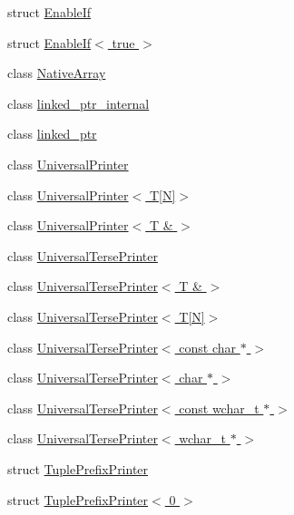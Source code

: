 \begin{DoxyCompactItemize}
\item 
struct \hyperlink{structtesting_1_1internal_1_1EnableIf}{Enable\-If}
\item 
struct \hyperlink{structtesting_1_1internal_1_1EnableIf_3_01true_01_4}{Enable\-If$<$ true $>$}
\item 
class \hyperlink{classtesting_1_1internal_1_1NativeArray}{Native\-Array}
\item 
class \hyperlink{classtesting_1_1internal_1_1linked__ptr__internal}{linked\-\_\-ptr\-\_\-internal}
\item 
class \hyperlink{classtesting_1_1internal_1_1linked__ptr}{linked\-\_\-ptr}
\item 
class \hyperlink{classtesting_1_1internal_1_1UniversalPrinter}{Universal\-Printer}
\item 
class \hyperlink{classtesting_1_1internal_1_1UniversalPrinter_3_01T[N]_4}{Universal\-Printer$<$ T\mbox{[}\-N\mbox{]}$>$}
\item 
class \hyperlink{classtesting_1_1internal_1_1UniversalPrinter_3_01T_01_6_01_4}{Universal\-Printer$<$ T \& $>$}
\item 
class \hyperlink{classtesting_1_1internal_1_1UniversalTersePrinter}{Universal\-Terse\-Printer}
\item 
class \hyperlink{classtesting_1_1internal_1_1UniversalTersePrinter_3_01T_01_6_01_4}{Universal\-Terse\-Printer$<$ T \& $>$}
\item 
class \hyperlink{classtesting_1_1internal_1_1UniversalTersePrinter_3_01T[N]_4}{Universal\-Terse\-Printer$<$ T\mbox{[}\-N\mbox{]}$>$}
\item 
class \hyperlink{classtesting_1_1internal_1_1UniversalTersePrinter_3_01const_01char_01_5_01_4}{Universal\-Terse\-Printer$<$ const char $\ast$ $>$}
\item 
class \hyperlink{classtesting_1_1internal_1_1UniversalTersePrinter_3_01char_01_5_01_4}{Universal\-Terse\-Printer$<$ char $\ast$ $>$}
\item 
class \hyperlink{classtesting_1_1internal_1_1UniversalTersePrinter_3_01const_01wchar__t_01_5_01_4}{Universal\-Terse\-Printer$<$ const wchar\-\_\-t $\ast$ $>$}
\item 
class \hyperlink{classtesting_1_1internal_1_1UniversalTersePrinter_3_01wchar__t_01_5_01_4}{Universal\-Terse\-Printer$<$ wchar\-\_\-t $\ast$ $>$}
\item 
struct \hyperlink{structtesting_1_1internal_1_1TuplePrefixPrinter}{Tuple\-Prefix\-Printer}
\item 
struct \hyperlink{structtesting_1_1internal_1_1TuplePrefixPrinter_3_010_01_4}{Tuple\-Prefix\-Printer$<$ 0 $>$}

\end{DoxyCompactItemize}
